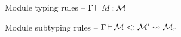 \documentclass{article}
\theoremstyle{definition}
\begin{document}
%   


%   

\begin{figure}[tbp]
  \vspace{-3mm}
  \caption{Module typing rules -- $\Gamma \operatorname{\vdash}_{} M \operatorname{:} \mathcal M$}
  \label{module:typing}
\end{figure}

\begin{figure}[tbp]
  \vspace{-3mm}
  \caption{Module subtyping rules -- $\Gamma \operatorname{\vdash} \mathcal M <: \mathcal M' \leadsto \mathcal M_r$}
  \label{module:subtyping}
\end{figure}
\end{document}
